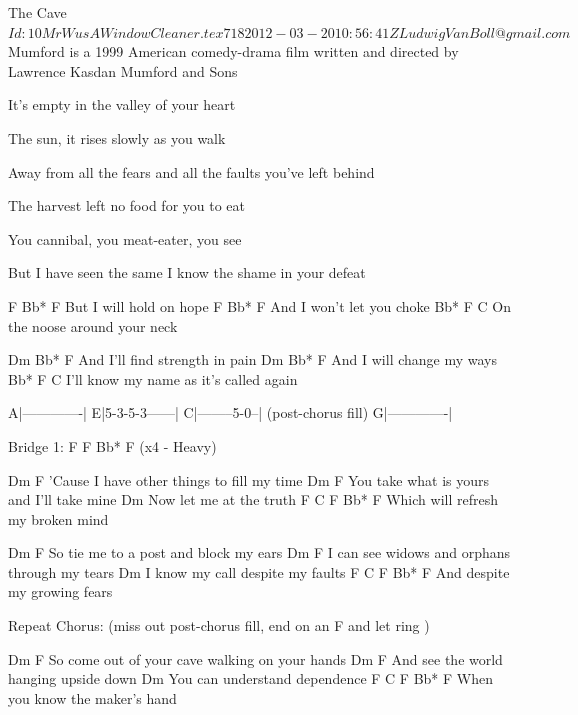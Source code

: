 \begin{SBSong}{The Cave}
  {$Id: 10MrWusAWindowCleaner.tex 718 2012-03-20 10:56:41Z LudwigVanBoll@gmail.com $}
  {Mumford is a 1999 American comedy-drama film written and directed by Lawrence Kasdan}
  {Mumford and Sons}
  \begin{SBVerse}
	It's empty in the valley of your heart
	
	The sun, it rises slowly as you walk
	
	Away from all the fears and all the faults you've left behind
  \end{SBVerse}
  \begin{SBVerse}
	The harvest left no food for you to eat
	
	You cannibal, you meat-eater, you see
	
	But I have seen the same I know the shame in your defeat
  \end{SBVerse}
  \begin{SBChorus}
    F      Bb*     F
But I will hold on hope
    F       Bb*     F
And I won't let you choke
Bb*    F      C
On the noose around your neck

    Dm        Bb*         F
And I'll find strength in pain
    Dm     Bb*       F
And I will change my ways
     Bb*     F            C
I'll know my name as it's called again
  \end{SBChorus}
A|-------------|
E|5-3-5-3------|
C|--------5-0--|    (post-chorus fill)
G|-------------|

Bridge 1:
F	F	Bb*	F	(x4  - Heavy)

  \begin{SBVerse}
                    Dm                F
'Cause I have other things to fill my time
                 Dm                  F
You take what is yours and I'll take mine
                  Dm
Now let me at the truth
             F        C      F       Bb* F
Which will refresh my broken mind

               Dm                F
So tie me to a post and block my ears
                     Dm                 F
I can see widows and orphans through my tears
                 Dm
I know my call despite my faults
      F        C       F             Bb* F
And despite my growing fears

Repeat Chorus: (miss out post-chorus fill,
			end on an F and let ring )

  \end{SBVerse}
  \begin{SBVerse}
                    Dm                   F
So come out of your cave walking on your hands
                  Dm             F
And see the world hanging upside down
                     Dm
You can understand dependence
         F        C       F           Bb* F
When you know the maker's hand


\end{SBVerse}
\end{SBSong}
